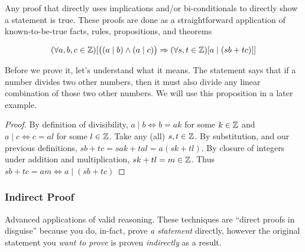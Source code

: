 \documentclass[main.tex]{subfiles}
\begin{document}
\begin{defn}
	
\end{defn}

\begin{defn}
	
\end{defn}

\begin{defn}
	Any proof that directly uses implications and/or bi-conditionals to directly show a statement is true. These proofs are done as a straightforward application of known-to-be-true facts, rules, propositions, and theorems
\end{defn}

\begin{prop}\label{prop:3.x-lin-combo-div}
	\[(\forall a,b,c \in \mathbb{Z})[\big((a \mid b) \land (a \mid c)\big) \Rightarrow (\forall s,t \in \mathbb{Z})[a \mid (sb + tc)]]\]
\end{prop}

Before we prove it, let's understand what it means. The statement says that if a number divides two other numbers, then it must also divide any linear combination of those two other numbers. We will use this proposition in a later example.

\begin{proof}
	By definition of divisibility, \(a \mid b \Leftrightarrow b = ak\) for some \(k \in \mathbb{Z}\) and \(a \mid c \Leftrightarrow c = al\) for some \(l \in \mathbb{Z}\). Take any (all) \(s,t \in \mathbb{Z}\). By substitution, and our previous definitions, \(sb + tc = sak + tal = a(sk + tl)\). By closure of integers under addition and multiplication, \(sk + tl = m \in \mathbb{Z}\). Thus \(sb + tc = am \Leftrightarrow a \mid (sb + tc)\)
\end{proof}

\begin{prop}
	
\end{prop}

\subsubsection{Indirect Proof}

Advanced applications of valid reasoning. These techniques are ``direct proofs in disguise'' because you do, in-fact, prove \textit{a statement} directly, however the original statement you \textit{want to prove} is proven \textit{indirectly} as a result.
\end{document}
